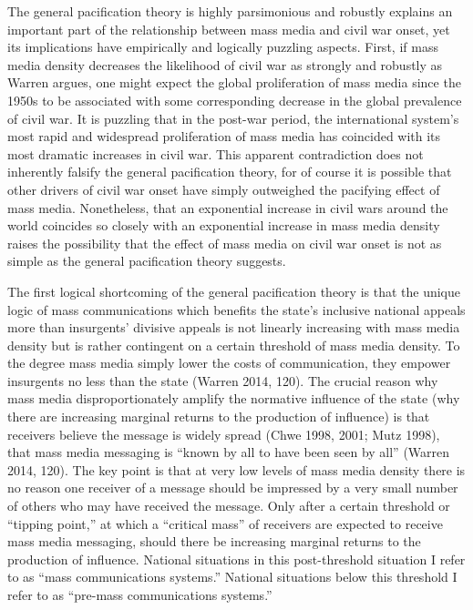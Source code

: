 \documentclass[11pt,article,oneside]{memoir}
\begin{document}
The general pacification theory is highly parsimonious and robustly
explains an important part of the relationship between mass media and
civil war onset, yet its implications have empirically and logically
puzzling aspects. First, if mass media density decreases the likelihood
of civil war as strongly and robustly as Warren argues, one might expect
the global proliferation of mass media since the 1950s to be associated
with some corresponding decrease in the global prevalence of civil war.
It is puzzling that in the post-war period, the international system's
most rapid and widespread proliferation of mass media has coincided with
its most dramatic increases in civil war. This apparent contradiction
does not inherently falsify the general pacification theory, for of
course it is possible that other drivers of civil war onset have simply
outweighed the pacifying effect of mass media. Nonetheless, that an
exponential increase in civil wars around the world coincides so closely
with an exponential increase in mass media density raises the
possibility that the effect of mass media on civil war onset is not as
simple as the general pacification theory suggests.

The first logical shortcoming of the general pacification theory is that
the unique logic of mass communications which benefits the state's
inclusive national appeals more than insurgents' divisive appeals is not
linearly increasing with mass media density but is rather contingent on
a certain threshold of mass media density. To the degree mass media
simply lower the costs of communication, they empower insurgents no less
than the state (Warren 2014, 120). The crucial reason why mass media
disproportionately amplify the normative influence of the state (why
there are increasing marginal returns to the production of influence) is
that receivers believe the message is widely spread (Chwe 1998, 2001;
Mutz 1998), that mass media messaging is ``known by all to have been
seen by all'' (Warren 2014, 120). The key point is that at very low
levels of mass media density there is no reason one receiver of a
message should be impressed by a very small number of others who may
have received the message. Only after a certain threshold or ``tipping
point,'' at which a ``critical mass'' of receivers are expected to
receive mass media messaging, should there be increasing marginal
returns to the production of influence. National situations in this
post-threshold situation I refer to as ``mass communications systems.''
National situations below this threshold I refer to as ``pre-mass
communications systems.''
\end{document}
